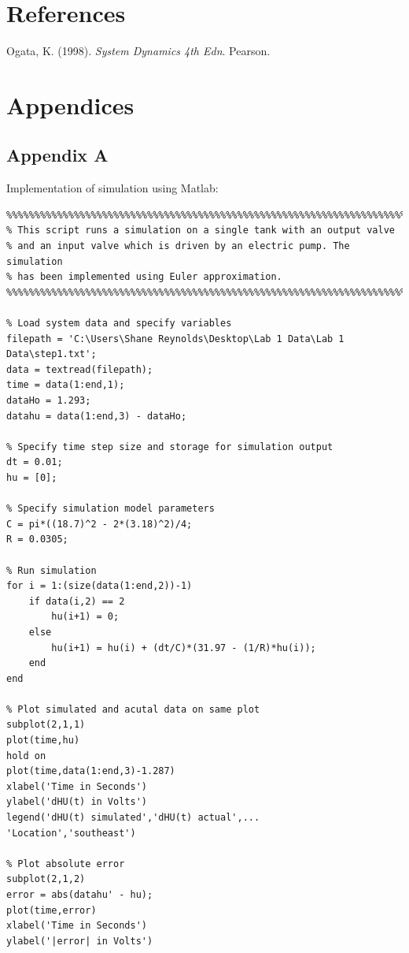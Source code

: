 \documentclass{article}
\begin{document}

\section{References}

Ogata, K. (1998). \textit{System Dynamics 4th Edn}. Pearson.

\newpage


\section{Appendices}

\subsection{Appendix A}
Implementation of simulation using Matlab:
\begin{lstlisting}
%%%%%%%%%%%%%%%%%%%%%%%%%%%%%%%%%%%%%%%%%%%%%%%%%%%%%%%%%%%%%%%%%%%%%%%%%%
% This script runs a simulation on a single tank with an output valve
% and an input valve which is driven by an electric pump. The simulation
% has been implemented using Euler approximation.
%%%%%%%%%%%%%%%%%%%%%%%%%%%%%%%%%%%%%%%%%%%%%%%%%%%%%%%%%%%%%%%%%%%%%%%%%%

% Load system data and specify variables
filepath = 'C:\Users\Shane Reynolds\Desktop\Lab 1 Data\Lab 1 Data\step1.txt';
data = textread(filepath);
time = data(1:end,1);
dataHo = 1.293;
datahu = data(1:end,3) - dataHo;

% Specify time step size and storage for simulation output
dt = 0.01;
hu = [0];

% Specify simulation model parameters
C = pi*((18.7)^2 - 2*(3.18)^2)/4;
R = 0.0305;

% Run simulation
for i = 1:(size(data(1:end,2))-1)
	if data(i,2) == 2
		hu(i+1) = 0;
	else
		hu(i+1) = hu(i) + (dt/C)*(31.97 - (1/R)*hu(i));
	end
end

% Plot simulated and acutal data on same plot
subplot(2,1,1)
plot(time,hu)
hold on
plot(time,data(1:end,3)-1.287)
xlabel('Time in Seconds')
ylabel('dHU(t) in Volts')
legend('dHU(t) simulated','dHU(t) actual',...
'Location','southeast')

% Plot absolute error
subplot(2,1,2)
error = abs(datahu' - hu);
plot(time,error)
xlabel('Time in Seconds')
ylabel('|error| in Volts')
\end{lstlisting}
\end{document}
